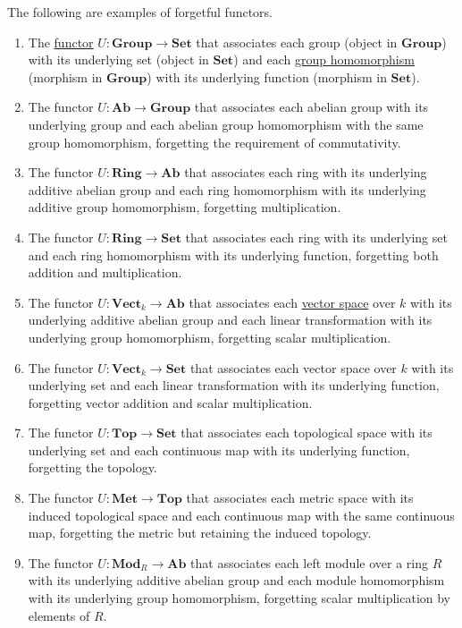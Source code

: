 	\begin{example}
	  \label{ex:forgetful-functors}
		The following are examples of forgetful functors.
		\begin{enumerate}
			\item The \hyperref[def:functor]{functor} $U: \mathbf{Group} \to \mathbf{Set}$ that associates each group (object in $\mathbf{Group}$) with its underlying set (object in $\mathbf{Set}$) and each \hyperref[alg-def:group-homomorphism]{group homomorphism} (morphism in $\mathbf{Group}$) with its underlying function (morphism in $\mathbf{Set}$).
			\item The functor $U: \mathbf{Ab} \to \mathbf{Group}$ that associates each abelian group with its underlying group and each abelian group homomorphism with the same group homomorphism, forgetting the requirement of commutativity.
			\item The functor $U: \mathbf{Ring} \to \mathbf{Ab}$ that associates each ring with its underlying additive abelian group and each ring homomorphism with its underlying additive group homomorphism, forgetting multiplication.
			\item The functor $U: \mathbf{Ring} \to \mathbf{Set}$ that associates each ring with its underlying set and each ring homomorphism with its underlying function, forgetting both addition and multiplication.
			\item The functor $U: \mathbf{Vect}_k \to \mathbf{Ab}$ that associates each \hyperref[lin-def:vector-space]{vector space} over $k$ with its underlying additive abelian group and each linear transformation with its underlying group homomorphism, forgetting scalar multiplication.
			\item The functor $U: \mathbf{Vect}_k \to \mathbf{Set}$ that associates each vector space over $k$ with its underlying set and each linear transformation with its underlying function, forgetting vector addition and scalar multiplication.
			\item The functor $U: \mathbf{Top} \to \mathbf{Set}$ that associates each topological space with its underlying set and each continuous map with its underlying function, forgetting the topology.
			\item The functor $U: \mathbf{Met} \to \mathbf{Top}$ that associates each metric space with its induced topological space and each continuous map with the same continuous map, forgetting the metric but retaining the induced topology.
			\item The functor $U: \mathbf{Mod}_R \to \mathbf{Ab}$ that associates each left module over a ring $R$ with its underlying additive abelian group and each module homomorphism with its underlying group homomorphism, forgetting scalar multiplication by elements of $R$.
		\end{enumerate}
	\end{example}

